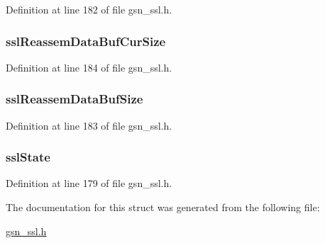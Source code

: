 Definition at line 182 of file gsn\_\-ssl.h.

\hypertarget{a00245_a5b80cbb76c258b69ef230d9a17e978ac}{
\subsubsection[{sslReassemDataBufCurSize}]{ {\bf sslReassemDataBufCurSize}}}
\label{a00245_a5b80cbb76c258b69ef230d9a17e978ac}


Definition at line 184 of file gsn\_\-ssl.h.

\hypertarget{a00245_a74c1a364bfc6690c798543c316088c1b}{
\subsubsection[{sslReassemDataBufSize}]{ {\bf sslReassemDataBufSize}}}
\label{a00245_a74c1a364bfc6690c798543c316088c1b}


Definition at line 183 of file gsn\_\-ssl.h.

\hypertarget{a00245_a51862f5394c213c6b8ffaa502455d403}{
\subsubsection[{sslState}]{ {\bf sslState}}}
\label{a00245_a51862f5394c213c6b8ffaa502455d403}


Definition at line 179 of file gsn\_\-ssl.h.



The documentation for this struct was generated from the following file:\begin{DoxyCompactItemize}
\item 
\hyperlink{a00590}{gsn\_\-ssl.h}\end{DoxyCompactItemize}
